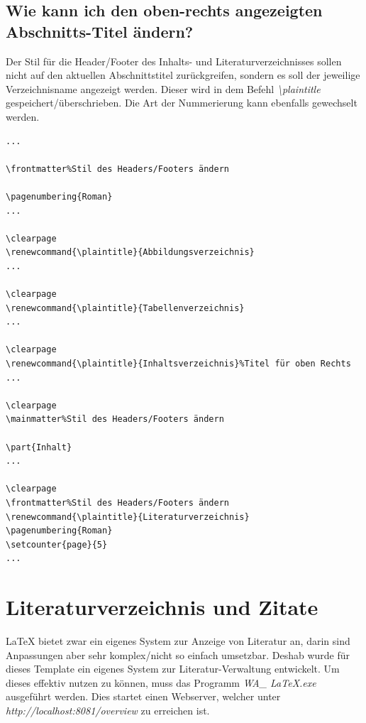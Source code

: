 \documentclass[12pt]{article}
\begin{document}
\subsection{Wie kann ich den oben-rechts angezeigten Abschnitts-Titel ändern?}
Der Stil für die Header/Footer des Inhalts- und Literaturverzeichnisses sollen nicht auf den aktuellen Abschnittstitel zurückgreifen, sondern es soll der jeweilige Verzeichnisname angezeigt werden. Dieser wird in dem Befehl \textit{\textbackslash plaintitle} gespeichert/überschrieben. Die Art der Nummerierung kann ebenfalls gewechselt werden.
\begin{verbatim}
...

\frontmatter%Stil des Headers/Footers ändern

\pagenumbering{Roman}
...

\clearpage
\renewcommand{\plaintitle}{Abbildungsverzeichnis}
...

\clearpage
\renewcommand{\plaintitle}{Tabellenverzeichnis}
...

\clearpage
\renewcommand{\plaintitle}{Inhaltsverzeichnis}%Titel für oben Rechts
...

\clearpage
\mainmatter%Stil des Headers/Footers ändern

\part{Inhalt}
...

\clearpage
\frontmatter%Stil des Headers/Footers ändern
\renewcommand{\plaintitle}{Literaturverzeichnis}
\pagenumbering{Roman}
\setcounter{page}{5}
...
\end{verbatim}

\section{Literaturverzeichnis und Zitate}
LaTeX bietet zwar ein eigenes System zur Anzeige von Literatur an, darin sind Anpassungen aber sehr komplex/nicht so einfach umsetzbar. Deshab wurde für dieses Template ein eigenes System zur Literatur-Verwaltung entwickelt. Um dieses effektiv nutzen zu können, muss das Programm \textit{WA\_ LaTeX.exe} ausgeführt werden. Dies startet einen Webserver, welcher unter \textit{http://localhost:8081/overview} zu erreichen ist.
\end{document}

